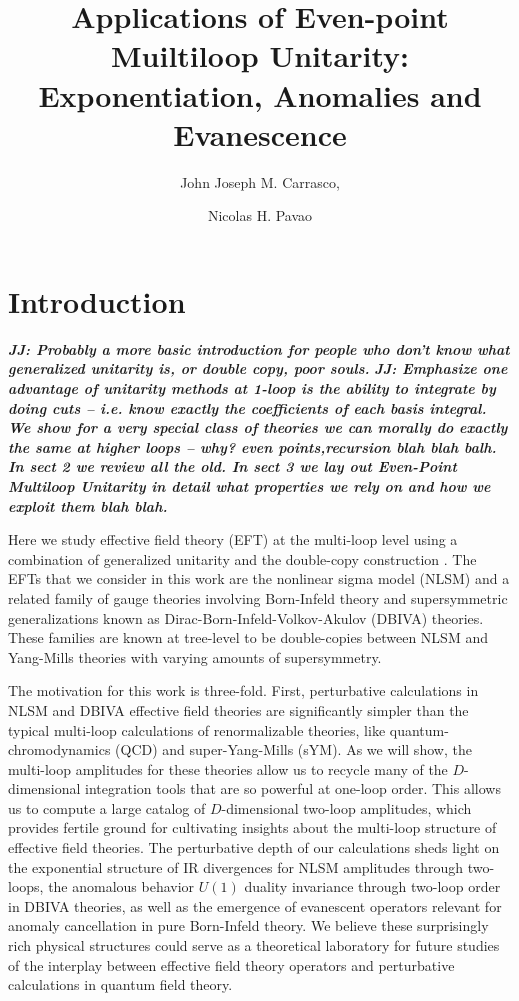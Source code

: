 \documentclass[12pt,letter]{article}
\author[1]{John Joseph M. Carrasco,}
\author[1]{Nicolas H. Pavao}
\affiliation[1]{Department of Physics and Astronomy, Northwestern
  University, Evanston, Illinois 60208, USA}
\title{Applications of Even-point Muiltiloop Unitarity: Exponentiation, Anomalies and Evanescence}
\def\dj#1{{\color{NUpurple}\it \bf JJ: #1}}
\begin{document}
\maketitle
\flushbottom
 

\section{Introduction}\label{sec:intro}
\dj{Probably a more basic introduction for people who don't know what generalized unitarity is, or double copy, poor souls.}
\dj{Emphasize one advantage of unitarity methods at 1-loop is the ability to integrate by doing cuts -- i.e. know exactly the coefficients of each basis integral.  We show for a very special class of theories we can morally do exactly the same at higher loops -- why? even points,recursion blah blah balh.  In sect 2 we review all the old.  In sect 3 we lay out Even-Point Multiloop Unitarity in detail what properties we rely on and how we exploit them blah blah.  }


Here we study  effective field theory (EFT) at the multi-loop level using a combination of generalized unitarity \cite{UnitarityMethod, Fusing, BDKUniarityReview} and the double-copy construction \cite{BCJ, BCJLoop}. The EFTs that we consider in this work are the nonlinear sigma model (NLSM) and a related family of gauge theories involving Born-Infeld theory and supersymmetric generalizations known as Dirac-Born-Infeld-Volkov-Akulov (DBIVA) theories. These families are known at tree-level to be double-copies between NLSM and Yang-Mills theories with varying amounts of supersymmetry.  

The motivation for this work is three-fold. First, perturbative calculations in NLSM and DBIVA effective field theories are significantly simpler than the typical multi-loop calculations of renormalizable theories, like quantum-chromodynamics (QCD) and super-Yang-Mills (sYM). As we will show, the multi-loop amplitudes for these theories allow us to recycle many of the $D$-dimensional integration tools that are so powerful at one-loop order. This allows us to compute a large catalog of $D$-dimensional two-loop amplitudes, which provides fertile ground for cultivating insights about the multi-loop structure of effective field theories. The perturbative depth of our calculations sheds light on the exponential structure of IR divergences for NLSM amplitudes through two-loops, the anomalous behavior $U(1)$ duality invariance through two-loop order in DBIVA theories, as well as the emergence of evanescent operators relevant for anomaly cancellation in pure Born-Infeld theory. We believe these surprisingly rich physical structures could serve as a theoretical laboratory for future studies of the interplay between effective field theory operators and perturbative calculations in quantum field theory. 
\end{document}
